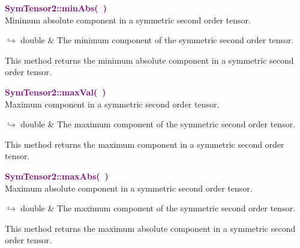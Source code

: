 \textcolor{purple}{\textbf{SymTensor2::minAbs(~)}}\label{SymTensor2::minAbs()}\\
Minimum absolute component in a symmetric second order tensor.\vspace*{-0.5em}
\begin{tcolorbox}[grow to left by=-1cm, width=\textwidth-1cm,myArgs,tabularx={l|R}]
$\hookrightarrow$ double & The minimum component of the symmetric second order tensor.
\end{tcolorbox}

This method returns the minimum absolute component in a symmetric second order tensor.

\textcolor{purple}{\textbf{SymTensor2::maxVal(~)}}\label{SymTensor2::maxVal()}\\
Maximum component in a symmetric second order tensor.\vspace*{-0.5em}
\begin{tcolorbox}[grow to left by=-1cm, width=\textwidth-1cm,myArgs,tabularx={l|R}]
$\hookrightarrow$ double & The maximum component of the symmetric second order tensor.
\end{tcolorbox}

This method returns the maximum component in a symmetric second order tensor.

\textcolor{purple}{\textbf{SymTensor2::maxAbs(~)}}\label{SymTensor2::maxAbs()}\\
Maximum absolute component in a symmetric second order tensor.\vspace*{-0.5em}
\begin{tcolorbox}[grow to left by=-1cm, width=\textwidth-1cm,myArgs,tabularx={l|R}]
$\hookrightarrow$ double & The maximum component of the symmetric second order tensor.
\end{tcolorbox}

This method returns the maximum absolute component in a symmetric second order tensor.

